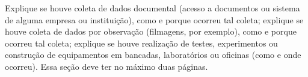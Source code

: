 \documentclass[
article,			%
11pt,				%
twoside,			%
a4paper,			%
section=TITLE,		%
onecolumn,          %
english,			%
brazil,				%
sumario=tradicional
]{abntex2}
\begin{document}
    Explique se houve coleta de dados documental (acesso a documentos ou sistema de alguma empresa ou instituição), como e porque ocorreu tal coleta; explique se houve coleta de dados por observação (filmagens, por exemplo), como e porque ocorreu tal coleta; explique se houve realização de testes, experimentos ou construção de equipamentos em bancadas, laboratórios ou oficinas (como e onde ocorreu). Essa seção deve ter no máximo duas páginas.




    
    

    
        
    \postextual                 %
    
    
    
\end{document}
